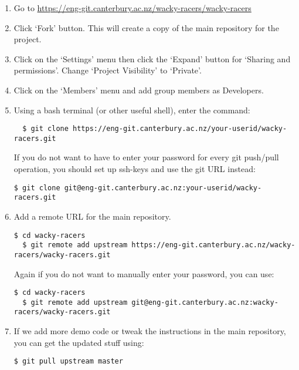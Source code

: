 \documentclass[11pt, a4paper]{article}
\begin{document}
\begin{enumerate}
\item Go to \url{https://eng-git.canterbury.ac.nz/wacky-racers/wacky-racers}

\item Click `Fork' button.  This will create a copy of the main repository for the project.

\item Click on the `Settings' menu then click the `Expand' button for
`Sharing and permissions'.  Change `Project Visibility' to `Private'.

\item Click on the `Members' menu and add group members as Developers.

\item Using a bash terminal (or other useful shell), enter the command:

\lstset{language=bash}
\lstset{basicstyle=\ttfamily\small}
\lstset{breaklines}

\begin{lstlisting}
  $ git clone https://eng-git.canterbury.ac.nz/your-userid/wacky-racers.git
\end{lstlisting}

If you do not want to have to enter your password for every git
push/pull operation, you should set up ssh-keys and use the git URL instead:

\begin{lstlisting}[breaklines]
  $ git clone git@eng-git.canterbury.ac.nz:your-userid/wacky-racers.git
\end{lstlisting}

\item Add a remote URL for the main repository.
%
\begin{lstlisting}[breaklines]
  $ cd wacky-racers
  $ git remote add upstream https://eng-git.canterbury.ac.nz/wacky-racers/wacky-racers.git
\end{lstlisting}
%
Again if you do not want to manually enter your password, you can use:
%
\begin{lstlisting}[breaklines]
  $ cd wacky-racers
  $ git remote add upstream git@eng-git.canterbury.ac.nz:wacky-racers/wacky-racers.git
\end{lstlisting}

\item If we add more demo code or tweak the instructions in the main
repository, you can get the updated stuff using:
%
\begin{lstlisting}[breaklines]
  $ git pull upstream master
\end{lstlisting}
\end{enumerate}
\end{document}
